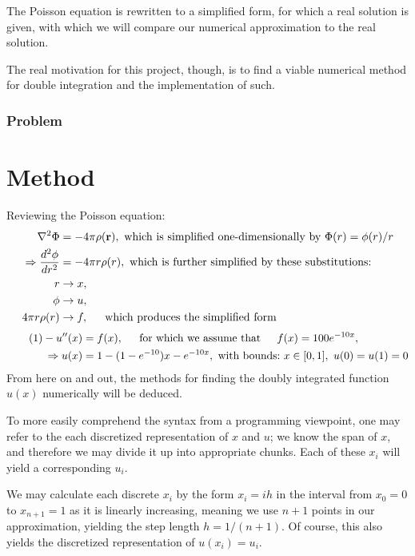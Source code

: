 \documentclass[11pt,a4paper,notitlepage]{article}
\begin{document}
The Poisson equation is rewritten to a simplified form, for which a real solution is given, with which we will compare our numerical approximation to the real solution.

The real motivation for this project, though, is to find a viable numerical method for double integration and the implementation of such.

\subsubsection{Problem}

\section{Method}
\label{section:method}

Reviewing the Poisson equation:
\begin{align*}
\nabla ^2 \Phi &= -4\pi\rho(\mathbf{r}), \ \text{which is simplified one-dimensionally by} \ \Phi(r) = \phi(r)/r \\
\Rightarrow \frac{d^2 \phi}{dr^2} &= -4\pi r \rho(r), \ \text{which is further simplified by these substitutions:}\\
r &\rightarrow x, \\
\phi &\rightarrow u,\\
4\pi r\rho(r) &\rightarrow f, \indent \text{which produces the simplified form}
\end{align*}\begin{align*}\label{eq:1}\tag{1}
-u''(x) &= f(x), \indent \text{for which we assume that} \indent f(x) = 100e^{-10x}, \\
\Rightarrow u(x) &= 1- (1-e^{-10})x - e^{-10x},\ \text{with bounds:}\ x \in [0,1],\ u(0) = u(1)= 0
\end{align*}
From here on and out, the methods for finding the doubly integrated function $u(x)$ numerically will be deduced.

To more easily comprehend the syntax from a programming viewpoint, one may refer to the each discretized representation of $x$ and $u$; we know the span of $x$, and therefore we may divide it up into appropriate chunks. Each of these $x_i$ will yield a corresponding $u_i$.

We may calculate each discrete $x_i$ by the form $x_i = ih$ in the interval from $x_0 = 0$ to $x_{n+1} = 1$ as it is linearly increasing, meaning we use $n+1$ points in our approximation, yielding the step length $h = 1/(n+1)$. Of course, this also yields the discretized representation of $u(x_i) = u_i$.
\end{document}
